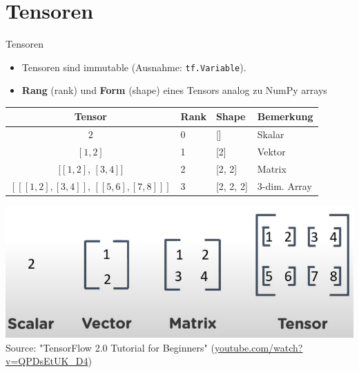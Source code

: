 \documentclass[utf8, smaller, c]{beamer}
\renewcommand{\tt}[1]{{\texttt{#1}}}
\begin{document}
\section{Tensoren}
\begin{frame}[fragile]{Tensoren}
	\begin{itemize}
		\item Tensoren sind immutable (Ausnahme: \tt{tf.Variable}).
		\item \textbf{Rang} (rank) und \textbf{Form} (shape) eines Tensors analog zu NumPy arrays
	\end{itemize}
	{\small
	\begin{center}
	\begin{tabular}{c|l|l|l}
		Tensor & Rank & Shape & Bemerkung \\ \hline
		$2$ & 0 & [] & Skalar \\
		$[1, 2]$ & 1 & [2] & Vektor \\
		$[[1, 2]$, $[3, 4]]$ & 2 & [2, 2] & Matrix \\
		$[[[1, 2], [3, 4]],\,[[5, 6], [7, 8]]]$ & 3 & [2, 2, 2] &  3-dim. Array
	\end{tabular}
	\includegraphics[scale=0.2]{pics/tensors}\\
	{\tiny Source: "TensorFlow 2.0 Tutorial for Beginners" (\url{youtube.com/watch?v=QPDsEtUK_D4})}
	\end{center}
	}
\end{frame}

\end{document}
